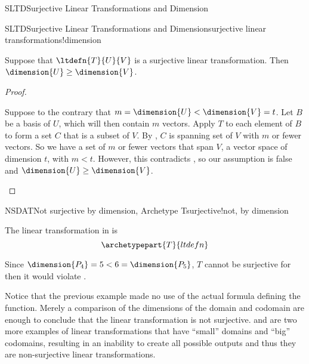 \begin{subsect}{SLTD}{Surjective Linear Transformations and Dimension}
%
\begin{theorem}{SLTD}{Surjective Linear Transformations and Dimension}{surjective linear transformations!dimension}
\begin{para}Suppose that $\ltdefn{T}{U}{V}$ is a surjective linear transformation.  Then $\dimension{U}\geq\dimension{V}$.\end{para}
\end{theorem}
%
\begin{proof}
%
\begin{para}Suppose to the contrary that
$m=\dimension{U}<\dimension{V}=t$.
Let $B$ be  a basis of $U$, which will then contain $m$ vectors.  Apply $T$ to each element of $B$ to form a set $C$ that is a subset of $V$.  By , $C$ is spanning set of $V$ with $m$ or fewer vectors.  So we have a set of $m$ or fewer vectors that span $V$, a vector space of dimension $t$, with
$m<t$.
However, this contradicts , so our assumption is false and $\dimension{U}\geq\dimension{V}$.\end{para}
%
\end{proof}
%
%
\begin{example}{NSDAT}{Not surjective by dimension, Archetype T}{surjective!not, by dimension}
\begin{para}The linear transformation in  is
%
\begin{equation*}
\archetypepart{T}{ltdefn}\end{equation*}\end{para}
%
\begin{para}Since
$\dimension{P_4}=5<6=\dimension{P_5}$,
$T$ cannot be surjective for then it would violate .\end{para}
%
\end{example}
%
\begin{para}Notice that the previous example made no use of the actual formula defining the function.  Merely a comparison of the dimensions of the domain and codomain are enough to conclude that the linear transformation is not surjective.   and  are two more examples of linear transformations that have ``small'' domains and ``big'' codomains, resulting in an inability to create all possible outputs and thus they are non-surjective linear transformations.\end{para}
%
\end{subsect}
